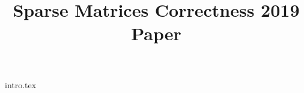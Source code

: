 \documentclass[sigconf]{acmart}
\begin{document}
\title{Sparse Matrices Correctness 2019 Paper}
\maketitle

{intro.tex}



\end{document}
